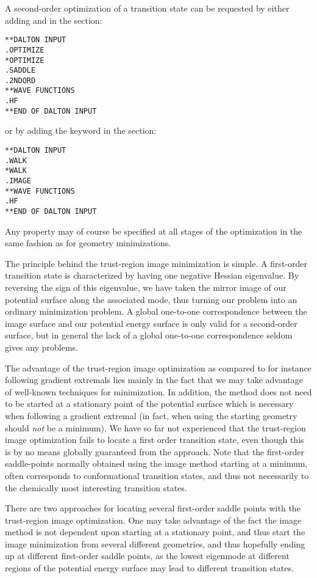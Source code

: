 A second-order optimization of a transition state can be requested by
either adding  and  in the 
section:
\begin{verbatim}
**DALTON INPUT
.OPTIMIZE
*OPTIMIZE
.SADDLE
.2NDORD
**WAVE FUNCTIONS
.HF
**END OF DALTON INPUT
\end{verbatim}
or by adding the keyword  in the  section:
\begin{verbatim}
**DALTON INPUT
.WALK
*WALK
.IMAGE
**WAVE FUNCTIONS
.HF
**END OF DALTON INPUT
\end{verbatim}

Any property may of course be specified at all stages of the
optimization in the same fashion as for geometry minimizations.

The principle behind the trust-region image minimization is simple. A
first-order transition state is characterized by having one negative
Hessian eigenvalue. By reversing the sign of this
eigenvalue, we have
taken the mirror image of our potential surface along the associated
mode, thus turning our problem into an ordinary
minimization problem. A global one-to-one correspondence between the
image surface and our potential energy surface is only valid for a
second-order surface, but in general the lack of a global one-to-one
correspondence seldom gives any problems.

The advantage of the trust-region image optimization as compared to
for instance following gradient extremals
lies mainly in the
fact that we may take advantage of well-known techniques for
minimization. In addition, the method does not need to be started at
a stationary point of the potential surface which is necessary when
following a gradient extremal (in fact, when using  the
starting geometry should {\em not} be a minimum). We
have so far not experienced that the trust-region image optimization
fails to locate a first order transition state, even though this is by
no means globally guaranteed from the approach. Note that the
first-order saddle-points normally obtained using the image method
starting at a minimum, often corresponds to conformational transition
states, and thus not necessarily to the chemically most interesting
transition states.

There are two approaches for locating several first-order saddle
points with the trust-region image optimization. One may take
advantage of the fact the image method is not dependent upon starting
at a stationary point, and thus start the image minimization from
several different geometries, and thus hopefully ending up at different
first-order saddle points, as the lowest eigenmode
at different
regions of the potential energy surface may lead to different
transition states.

